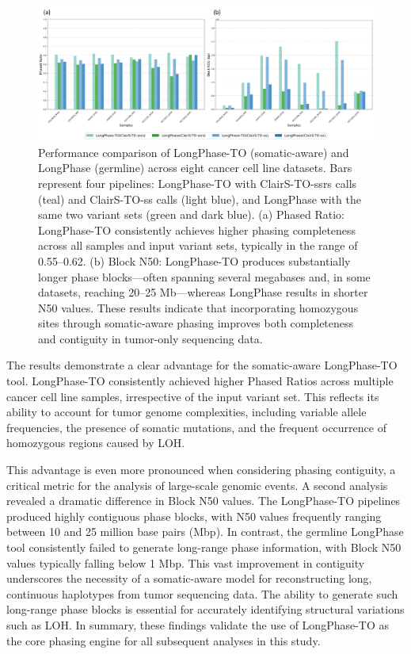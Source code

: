 \documentclass[pdflatex,sn-nature]{sn-jnl}
\def\pandocbounded#1{%
  \begingroup
  \setkeys{Gin}{width=1.0\linewidth,height=1.0\textheight,keepaspectratio}%
  #1%
  \endgroup
}
\begin{document}
\begin{figure}
\centering
\pandocbounded{\includegraphics[keepaspectratio]{page_29_cropped.jpg}}
\caption[Comparison of Somatic-aware and Germline Phasers]{Performance comparison of LongPhase-TO (somatic-aware) and LongPhase (germline) across eight cancer cell line datasets. Bars represent four pipelines: LongPhase-TO with ClairS-TO-ssrs calls (teal) and ClairS-TO-ss calls (light blue), and LongPhase with the same two variant sets (green and dark blue). (a) Phased Ratio: LongPhase-TO consistently achieves higher phasing completeness across all samples and input variant sets, typically in the range of 0.55–0.62. (b) Block N50: LongPhase-TO produces substantially longer phase blocks—often spanning several megabases and, in some datasets, reaching 20–25 Mb—whereas LongPhase results in shorter N50 values. These results indicate that incorporating homozygous sites through somatic-aware phasing improves both completeness and contiguity in tumor-only sequencing data.}\label{fig:met-page-29-cropped-jpg}
\end{figure}

The results demonstrate a clear advantage for the somatic-aware LongPhase-TO tool. LongPhase-TO consistently achieved higher Phased Ratios across multiple cancer cell line samples, irrespective of the input variant set. This reflects its ability to account for tumor genome complexities, including variable allele frequencies, the presence of somatic mutations, and the frequent occurrence of homozygous regions caused by LOH.

This advantage is even more pronounced when considering phasing contiguity, a critical metric for the analysis of large-scale genomic events. A second analysis revealed a dramatic difference in Block N50 values. The LongPhase-TO pipelines produced highly contiguous phase blocks, with N50 values frequently ranging between 10 and 25 million base pairs (Mbp). In contrast, the germline LongPhase tool consistently failed to generate long-range phase information, with Block N50 values typically falling below 1 Mbp. This vast improvement in contiguity underscores the necessity of a somatic-aware model for reconstructing long, continuous haplotypes from tumor sequencing data. The ability to generate such long-range phase blocks is essential for accurately identifying structural variations such as LOH. In summary, these findings validate the use of LongPhase-TO as the core phasing engine for all subsequent analyses in this study.
\end{document}
